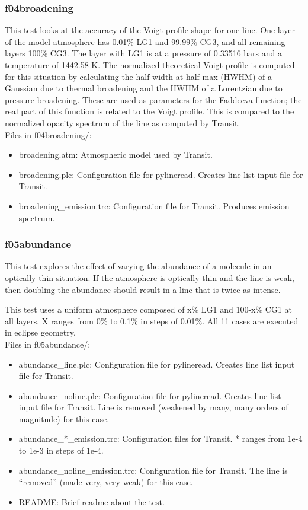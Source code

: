 \documentclass[letterpaper, 12pt]{article}
\begin{document}
\subsubsection{f04broadening}
\label{sec:broadening}
This test looks at the accuracy of the Voigt profile shape for one line. 
One layer of the model atmosphere has 0.01\% LG1 and 99.99\% CG3, and 
all remaining layers 100\% CG3. The layer with LG1 is at a pressure of 
0.33516 bars and a temperature of 1442.58 K. The normalized theoretical Voigt 
profile is computed for this situation by calculating the half width at 
half max (HWHM) of a Gaussian due to thermal broadening and the HWHM of 
a Lorentzian due to pressure broadening. These are used as parameters for 
the Faddeeva function; the real part of this function is related to the 
Voigt profile. This is compared to the normalized opacity spectrum of the 
line as computed by Transit.\\

Files in f04broadening/:
\begin{itemize} \itemsep0pt
  \item broadening.atm: Atmospheric model used by Transit.
  \item broadening.plc: Configuration file for pylineread. Creates line 
        list input file for Transit.
  \item broadening{\_}emission.trc: Configuration file for Transit. Produces 
        emission spectrum.
\end{itemize}

\subsubsection{f05abundance}
\label{sec:abundance}
This test explores the effect of varying the abundance of a molecule in an 
optically-thin situation. If the atmosphere is optically thin and the line 
is weak, then doubling the abundance should result in a line that is twice as 
intense.

This test uses a uniform atmosphere composed of x\% LG1 and 100-x\% CG1 at 
all layers. X ranges from 0\% to 0.1\% in steps of 0.01\%. All 11 cases 
are executed in eclipse geometry.\\

Files in f05abundance/:
\begin{itemize} \itemsep0pt
  \item abundance{\_}line.plc: Configuration file for pylineread. Creates 
        line list input file for Transit.
  \item abundance{\_}noline.plc: Configuration file for pylineread. 
        Creates line list input file for Transit. Line is removed (weakened by many, many orders of magnitude) for this case.
  \item abundance{\_}*{\_}emission.trc: Configuration files for Transit. * ranges 
        from 1e-4 to 1e-3 in steps of 1e-4.
  \item abundance{\_}noline{\_}emission.trc: Configuration file for Transit. The 
        line is ``removed'' (made very, very weak) for this case.
  \item README: Brief readme about the test.
\end{itemize}
\end{document}
